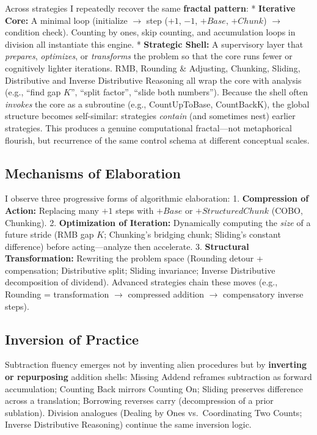 \documentclass[
]{article}
\begin{document}
Across strategies I repeatedly recover the same \textbf{fractal
pattern}: * \textbf{Iterative Core:} A minimal loop (initialize \(\to\)
step (\(+1\), \(-1\), \(+Base\), \(+Chunk\)) \(\to\) condition check).
Counting by ones, skip counting, and accumulation loops in division all
instantiate this engine. * \textbf{Strategic Shell:} A supervisory layer
that \emph{prepares}, \emph{optimizes}, or \emph{transforms} the problem
so that the core runs fewer or cognitively lighter iterations. RMB,
Rounding \& Adjusting, Chunking, Sliding, Distributive and Inverse
Distributive Reasoning all wrap the core with analysis (e.g., ``find gap
\(K\)'', ``split factor'', ``slide both numbers''). Because the shell
often \emph{invokes} the core as a subroutine (e.g., CountUpToBase,
CountBackK), the global structure becomes self-similar: strategies
\emph{contain} (and sometimes nest) earlier strategies. This produces a
genuine computational fractal---not metaphorical flourish, but
recurrence of the same control schema at different conceptual scales.

\subsection{Mechanisms of Elaboration}\label{mechanisms-of-elaboration}

I observe three progressive forms of algorithmic elaboration: 1.
\textbf{Compression of Action:} Replacing many \(+1\) steps with
\(+Base\) or \(+StructuredChunk\) (COBO, Chunking). 2.
\textbf{Optimization of Iteration:} Dynamically computing the
\emph{size} of a future stride (RMB gap \(K\); Chunking's bridging
chunk; Sliding's constant difference) before acting---analyze then
accelerate. 3. \textbf{Structural Transformation:} Rewriting the problem
space (Rounding detour + compensation; Distributive split; Sliding
invariance; Inverse Distributive decomposition of dividend). Advanced
strategies chain these moves (e.g., Rounding = transformation \(\to\)
compressed addition \(\to\) compensatory inverse steps).

\subsection{Inversion of Practice}\label{inversion-of-practice}

Subtraction fluency emerges not by inventing alien procedures but by
\textbf{inverting or repurposing} addition shells: Missing Addend
reframes subtraction as forward accumulation; Counting Back mirrors
Counting On; Sliding preserves difference across a translation;
Borrowing reverses carry (decompression of a prior sublation). Division
analogues (Dealing by Ones vs.~Coordinating Two Counts; Inverse
Distributive Reasoning) continue the same inversion logic.
\end{document}
